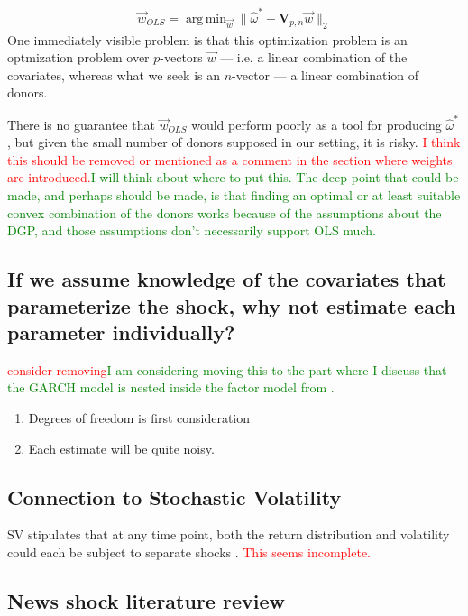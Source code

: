 \documentclass[11pt]{article}
\DeclareMathOperator*{\argmin}{arg\,min} %
\theoremstyle{definition}
\begin{document}
\begin{align*}{
\vec{w}_{OLS}=\argmin_{\vec{w}} \|\hat{\omega}^{*} - \textbf{V}_{p,n}\vec{w}\|_{2}}
\end{align*} 
One immediately visible problem is that this optimization problem is an optmization problem over $p$-vectors $\vec{w}$ --- i.e. a linear combination of the covariates, whereas what we seek is an $n$-vector --- a linear combination of donors.

There is no guarantee that $\vec{w}_{OLS}$ would perform poorly as a tool for producing $\hat\omega^{*}$, but given the small number of donors supposed in our setting, it is risky. \textcolor{red}{I think this should be removed or mentioned as a comment in the section where weights are introduced.}\textcolor{green}{I will think about where to put this.  The deep point that could be made, and perhaps should be made, is that finding an optimal or at least suitable convex combination of the donors works because of the assumptions about the DGP, and those assumptions don't necessarily support OLS much.}

\subsection{If we assume knowledge of the covariates that parameterize the shock, why not estimate each parameter individually?}
\textcolor{red}{consider removing}\textcolor{green}{I am considering moving this to the part where I discuss that the GARCH model is nested inside the factor model from \citet{abadie2010synthetic}.}
\begin{enumerate}
  \item Degrees of freedom is first consideration
  \item Each estimate will be quite noisy.
\end{enumerate}

\subsection{Connection to Stochastic Volatility}
SV stipulates that at any time point, both the return distribution and volatility could each be subject to separate shocks \citep{andersen2010stochastic}. \textcolor{red}{This seems incomplete.}

\subsection{News shock literature review}
\end{document}

